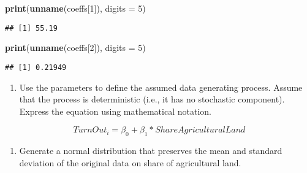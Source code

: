 \documentclass[
]{book}
\newenvironment{Shaded}{\begin{snugshade}}{\end{snugshade}}
\newcommand{\AttributeTok}[1]{\textcolor[rgb]{0.13,0.29,0.53}{#1}}
\newcommand{\DecValTok}[1]{\textcolor[rgb]{0.00,0.00,0.81}{#1}}
\newcommand{\FunctionTok}[1]{\textcolor[rgb]{0.13,0.29,0.53}{\textbf{#1}}}
\newcommand{\NormalTok}[1]{#1}
\providecommand{\tightlist}{%
  \setlength{\itemsep}{0pt}\setlength{\parskip}{0pt}}
\begin{document}
\begin{Shaded}
\begin{Highlighting}[]
\FunctionTok{print}\NormalTok{(}\FunctionTok{unname}\NormalTok{(coeffs[}\DecValTok{1}\NormalTok{]), }\AttributeTok{digits =} \DecValTok{5}\NormalTok{)}
\end{Highlighting}
\end{Shaded}

\begin{verbatim}
## [1] 55.19
\end{verbatim}

\begin{Shaded}
\begin{Highlighting}[]
\FunctionTok{print}\NormalTok{(}\FunctionTok{unname}\NormalTok{(coeffs[}\DecValTok{2}\NormalTok{]), }\AttributeTok{digits =} \DecValTok{5}\NormalTok{)}
\end{Highlighting}
\end{Shaded}

\begin{verbatim}
## [1] 0.21949
\end{verbatim}

\begin{enumerate}
\def\labelenumi{\roman{enumi}.}
\tightlist
\item
  Use the parameters to define the assumed data generating process. Assume that the process is deterministic (i.e., it has no stochastic component). Express the equation using mathematical notation.
\end{enumerate}

\[TurnOut_i = \beta_0 + \beta_1 * ShareAgriculturalLand\]

\begin{enumerate}
\def\labelenumi{\roman{enumi}.}
\tightlist
\item
  Generate a normal distribution that preserves the mean and standard deviation of the original data on share of agricultural land.
\end{enumerate}
\end{document}
